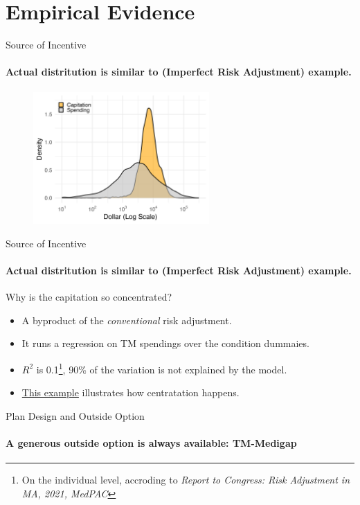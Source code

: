 \section{Empirical Evidence}



\begin{frame}[label=actual_distribution]{Source of Incentive}
    \framesubtitle{\textcolor{structure}{Actual distritution is similar to (Imperfect Risk Adjustment) example.}}
    \begin{figure}
        \includegraphics[width=0.6\textwidth]{figures/images/capitation_spending_distribution_togather.png}
    \end{figure}
    \hyperlink{example_distribution}{}
\end{frame}

\begin{frame}[label=source_of_incentive]{Source of Incentive}
    \framesubtitle{\textcolor{structure}{Actual distritution is similar to (Imperfect Risk Adjustment) example.}}
    Why is the capitation so concentrated?
    \begin{itemize}
        \item A byproduct of the \textit{conventional} risk adjustment.
        \item It runs a regression on TM spendings over the condition dummaies.
        \item $R^2$ is 0.1\footnote{On the individual level, accroding to \textit{Report to Congress: Risk Adjustment in MA, 2021, MedPAC}}, 90\% of the variation is not explained by the model.
        \item \hyperlink{example_start}{This example} illustrates how centratation happens.
    \end{itemize}
\end{frame}


\begin{frame}{Plan Design and Outside Option}
    \label{version1}
    \framesubtitle{\textcolor{structure}{A generous outside option is always available: TM-Medigap}}
    
    \hyperlink{version2}{}
\end{frame}


